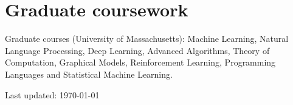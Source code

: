 \documentclass[10pt, a4paper]{article}
\begin{document}
\section*{Graduate coursework}

Graduate courses (University of Massachusetts): Machine Learning, Natural Language Processing, Deep Learning, Advanced Algorithms, Theory of Computation, Graphical Models, Reinforcement Learning, Programming Languages and Statistical Machine Learning.

\begin{center}
{\scriptsize  Last updated: \today\-
\\}
\end{center}
\end{document}
